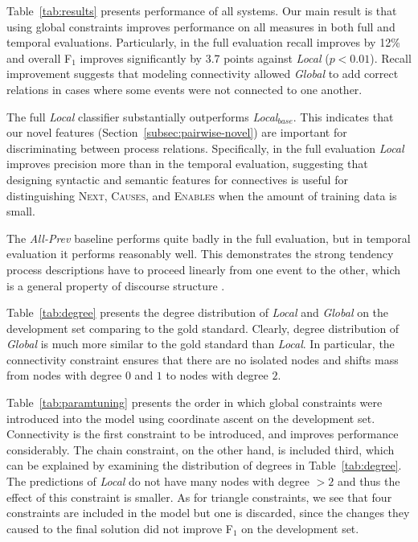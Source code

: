 Table~\ref{tab:results} presents performance of all systems. Our main result is that using global constraints improves performance on all measures in both full and temporal evaluations. Particularly, in the full evaluation recall improves by 12\% and overall F$_1$ improves significantly by 3.7 points against \emph{Local} ($p<0.01$). Recall improvement suggests that modeling connectivity allowed \emph{Global} to add correct relations in cases where some events were not connected to one another.

The full \emph{Local} classifier substantially outperforms \emph{Local$_{base}$}. This indicates that our novel features (Section~\ref{subsec:pairwise-novel}) are important for discriminating between process relations. Specifically, in the full evaluation \emph{Local} improves precision more than in the temporal evaluation, suggesting that designing syntactic and semantic features for connectives is useful for distinguishing \textsc{Next}, \textsc{Causes}, and \textsc{Enables} when the amount of training data is small.

The \emph{All-Prev} baseline performs quite badly in the full evaluation, but in temporal evaluation it performs reasonably well. This demonstrates the strong tendency process descriptions have to proceed linearly from one event to the other, which is a general property of discourse structure \cite{schegloff73}.

Table~\ref{tab:degree} presents the degree distribution of \emph{Local} and \emph{Global} on the development set comparing to the gold standard. Clearly, degree distribution of \emph{Global} is much more similar to the gold standard than \emph{Local}. In particular, the connectivity constraint ensures that there are no isolated nodes and shifts mass from nodes with degree $0$ and $1$ to nodes with degree $2$.

Table~\ref{tab:paramtuning} presents the order in which global constraints were introduced into the model using coordinate ascent on the development set. Connectivity is the first constraint to be introduced, and improves performance considerably. The chain constraint, on the other hand, is included third, which can be explained by examining the distribution of degrees in Table~\ref{tab:degree}. The predictions of \emph{Local} do not have many nodes with degree $>2$ and thus the effect of this constraint is smaller. As for triangle constraints, we see that four constraints are included in the model but one is discarded, since the changes they caused to the final solution did not improve F$_1$ on the development set.

